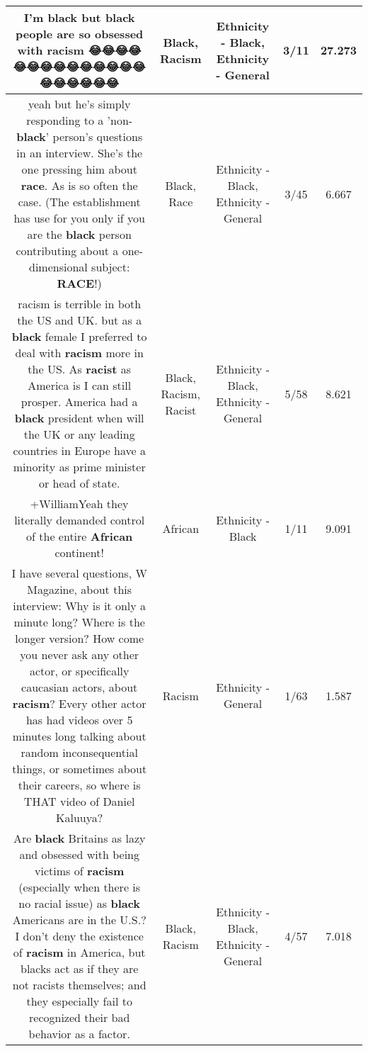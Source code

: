 \documentclass[11pt]{article}
\newlength\mylength
\begin{document}
\begin{center}
\begin{longtable}{|C{.65\mylength}|C{.30\mylength}|C{.12\mylength}|C{.12\mylength}|C{.12\mylength}|}
  \small I'm \textbf{black} but \textbf{black} people are so obsessed with \textbf{racism} 😂😂😂😂😂😂😂😂😂😂😂😂😂😂😂😂😂😂😂😂\normalsize   & Black, Racism & Ethnicity - Black, Ethnicity - General & 3/11 & 27.273 \\  \hline
  \small yeah but he's simply responding to a 'non-\textbf{black}' person's questions in an interview. She's the one pressing him about \textbf{race}. As is so often the case. (The establishment has use for you only if you are the \textbf{black} person contributing about a one-dimensional subject: \textbf{RACE}!)\normalsize   & Black, Race & Ethnicity - Black, Ethnicity - General & 3/45 & 6.667 \\  \hline
  \small racism is terrible in both the US and UK. but as a \textbf{black} female I preferred to deal with \textbf{racism} more in the US. As \textbf{racist} as America is I can still prosper. America had a \textbf{black} president when will the UK or any leading countries in Europe have a minority as prime minister or head of state.\normalsize   & Black, Racism, Racist & Ethnicity - Black, Ethnicity - General & 5/58 & 8.621 \\  \hline
  \small +WilliamYeah they literally demanded control of the entire \textbf{African}  continent!\normalsize   & African & Ethnicity - Black & 1/11 & 9.091 \\  \hline
  \small I have several questions, W Magazine, about this interview: Why is it only a minute long? Where is the longer version? How come you never ask any other actor, or specifically caucasian actors, about \textbf{racism}? Every other actor has had videos over 5 minutes long talking about random inconsequential things, or sometimes about their careers, so where is THAT video of Daniel Kaluuya?\normalsize   & Racism & Ethnicity - General & 1/63 & 1.587 \\  \hline
  \small Are \textbf{black} Britains as lazy and obsessed with being victims of \textbf{racism} (especially when there is no racial issue) as \textbf{black} Americans are in the U.S.? I don't deny the existence of \textbf{racism} in America, but blacks act as if they are not racists themselves; and they especially fail to recognized their bad behavior as a factor.\normalsize   & Black, Racism & Ethnicity - Black, Ethnicity - General & 4/57 & 7.018 \\  \hline

\end{longtable}
\end{center}
\end{document}
